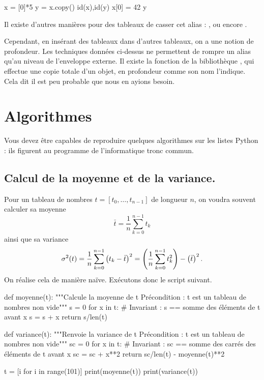 \begin{pyconsole}
x = [0]*5
y = x.copy()
id(x),id(y)
x[0] = 42
y
\end{pyconsole}

Il existe d'autres manières pour des tableaux de casser cet alias : ,  ou encore .

Cependant, en insérant des tableaux dans d'autres tableaux, on a une notion de \og profondeur\fg. Les 
techniques données ci-dessus ne permettent de rompre un alias qu'au niveau de l'enveloppe externe. 
Il existe la fonction  de la bibliothèque , qui effectue une copie totale 
d'un objet, en profondeur comme son nom l'indique. Cela dit il est peu probable que nous en ayions 
besoin.

\section{Algorithmes}

Vous devez être capables de reproduire quelques algorithmes sur les listes Python : ils figurent 
au programme de l'informatique tronc commun.

\subsection{Calcul de la moyenne et de la variance.}
  Pour un tableau de nombres $t = [t_0,\dots,t_{n-1}]$ de longueur $n$, on voudra souvent calculer sa moyenne 
  \begin{equation*}
    \bar{t} = \dfrac{1}{n} \sum_{k=0}^{n-1} t_k 
  \end{equation*}
  ainsi que sa variance 
  \begin{equation*}
    \sigma^2(t) = \dfrac{1}{n} \sum_{k=0}^{n-1} \left( t_k - \bar{t}\right)^2 = \left( \dfrac{1}{n} \sum_{k=0}^{n-1} t_k^2\right) - \left( \bar{t}\right)^2. 
  \end{equation*}
  On réalise cela de manière naïve. Exécutons donc le script suivant.

\begin{pyverbatim}
def moyenne(t):
    """Calcule la moyenne de t
       Précondition : t est un tableau de nombres non vide"""
    s = 0 
    for x in t:
        # Invariant : s == somme des éléments de t avant x
        s = s + x 
    return s/len(t)
\end{pyverbatim}

\begin{pyverbatim}
def variance(t):
    """Renvoie la variance de t
       Précondition : t est un tableau de nombres non vide"""
    sc = 0
    for x in t:
        # Invariant : sc == somme des carrés des éléments de t avant x
        sc = sc + x**2 
    return sc/len(t) - moyenne(t)**2

t = [i for i in range(101)]
print(moyenne(t))
print(variance(t))
\end{pyverbatim}


